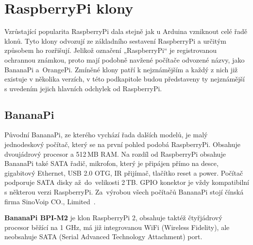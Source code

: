 
\section{RaspberryPi klony}
\label{KapRaspiKlony}

Vzrůstající popularita RaspberryPi dala stejně jak u Arduina vzniknout celé řadě klonů. Tyto klony odvozují ze základního sestavení RaspberryPi a určitým způsobem ho rozřišují. Jelikož označení „RaspberryPi“ je registrovanou ochrannou známkou, proto mají podobně navžené počítače odvozené názvy, jako BananaPi a~OrangePi. Zmíněné klony patří k nejznámějším a každý z nich již existuje v několika verzích, v této podkapitole budou představeny ty nejznámější s uvedením jejich hlavních odchylek od RaspberryPi.

	\subsection{BananaPi}
		Původní BananaPi, ze kterého vychází řada dalších modelů, je malý jednodeskový počítač, který se na první pohled podobá RaspberryPi.  Obsahuje dvoujádrový procesor a 512\,MB RAM. Na rozdíl od RaspberryPi obsahuje BananaPi také SATA řadič, mikrofon, který je připájen přímo na desce, gigabitový Ethernet, USB 2.0 OTG, IR přijímač, tlačítko reset a power. Počítač podporuje SATA disky až~do~velikosti 2\,TB. GPIO konektor je vždy kompatibilní s některou verzi RaspberryPi. Za~výrobou všech počítačů BananaPi stojí čínská firma SinoVoip CO., Limited~\cite{BananaPi}.
		
	\textbf{BananaPi BPI-M2} je klon RaspberryPi 2, obsahuje taktéž čtyřjádrový procesor běžící na 1 GHz, má již integrovanou WiFi (Wireless Fidelity), ale neobsahuje SATA (Serial Advanced Technology Attachment) port.
	
